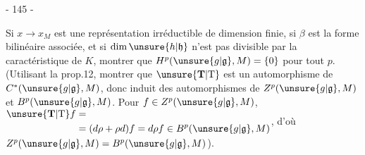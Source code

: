 \begin{center}- 145 -\end{center}

Si $x\longrightarrow x_M$ est une représentation irréductible de dimension finie, si $\beta$ est la forme bilinéaire associée, et si $\dim\unsure{h|\mathfrak h}$ n'est pas divisible par la caractéristique de $K$, montrer que $H^p(\unsure{g|\mathfrak g},M)=\{0\}$ pour tout $p$. (Utilisant la prop.12, montrer que $\unsure{\mathbf T|\mathrm T}$ est un automorphisme de $C^*(\unsure{g|\mathfrak g},M)$, donc induit des automorphismes de $Z^p(\unsure{g|\mathfrak g},M)$ et $B^p(\unsure{g|\mathfrak g},M)$. Pour $f\in Z^p(\unsure{g|\mathfrak g},M)$, $\begin{aligned}\unsure{\mathbf T|\mathrm T}f&=\\&=(d\rho+\rho d)f=d\rho f\in B^p(\unsure{g|\mathfrak g},M)\end{aligned}$, d'où $Z^p(\unsure{g|\mathfrak g},M)=B^p(\unsure{g|\mathfrak g},M)$).
